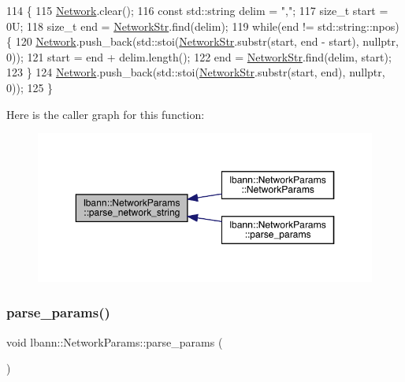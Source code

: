 \begin{DoxyCode}
114                                               \{
115   \hyperlink{classlbann_1_1NetworkParams_a17ccde99dec30d27c836a23f003fa34d}{Network}.clear();
116   \textcolor{keyword}{const} std::string delim = \textcolor{stringliteral}{","};
117   \textcolor{keywordtype}{size\_t} start = 0U;
118   \textcolor{keywordtype}{size\_t} end = \hyperlink{classlbann_1_1NetworkParams_a8b503690c7475582b5a843f0959c3f2a}{NetworkStr}.find(delim);
119   \textcolor{keywordflow}{while}(end != std::string::npos) \{
120     \hyperlink{classlbann_1_1NetworkParams_a17ccde99dec30d27c836a23f003fa34d}{Network}.push\_back(std::stoi(\hyperlink{classlbann_1_1NetworkParams_a8b503690c7475582b5a843f0959c3f2a}{NetworkStr}.substr(start, end - start), \textcolor{keyword}{nullptr}, 0));
121     start = end + delim.length();
122     end = \hyperlink{classlbann_1_1NetworkParams_a8b503690c7475582b5a843f0959c3f2a}{NetworkStr}.find(delim, start);
123   \}
124   \hyperlink{classlbann_1_1NetworkParams_a17ccde99dec30d27c836a23f003fa34d}{Network}.push\_back(std::stoi(\hyperlink{classlbann_1_1NetworkParams_a8b503690c7475582b5a843f0959c3f2a}{NetworkStr}.substr(start, end), \textcolor{keyword}{nullptr}, 0));
125 \}
\end{DoxyCode}
Here is the caller graph for this function\+:\nopagebreak
\begin{figure}[H]
\begin{center}
\leavevmode
\includegraphics[width=350pt]{classlbann_1_1NetworkParams_a14954fcbacb6c9522bd3cf6c28bc93d5_icgraph}
\end{center}
\end{figure}
\mbox{\label{classlbann_1_1NetworkParams_a9b6f7e0330547330238085f3fd0e3702}} 
\subsubsection{\texorpdfstring{parse\+\_\+params()}{parse\_params()}}
{\footnotesize\ttfamily void lbann\+::\+Network\+Params\+::parse\+\_\+params (\begin{DoxyParamCaption}{ }\end{DoxyParamCaption})}



